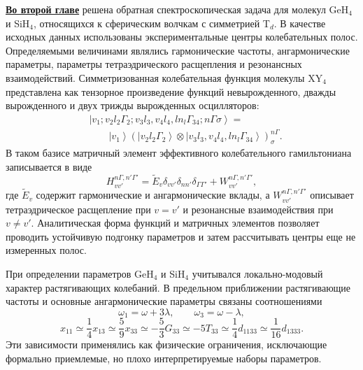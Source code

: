 \underline{\textbf{Во второй главе}} решена обратная спектроскопическая задача для молекул GeH$_4$
и SiH$_4$, относящихся к сферическим волчкам с симметрией T$_d$. В качестве исходных данных
использованы экспериментальные центры колебательных полос. Определяемыми величинами являлись
гармонические частоты, ангармонические параметры, параметры тетраэдрического расщепления и
резонансных взаимодействий. Симметризованная колебательная функция молекулы XY$_4$ представлена как
тензорное произведение функций невырожденного, дважды вырожденного и двух трижды вырожденных
осцилляторов:
\begin{equation}
\begin{aligned}
&\left|v_1;v_2l_2\Gamma_2;v_3l_3,v_4l_4,l n_l\Gamma_{34};n\Gamma\sigma\right\rangle =\\
&\qquad \left|v_1\right\rangle
\left(\left|v_2l_2\Gamma_2\right\rangle\otimes
\left|v_3l_3,v_4l_4,l n_l\Gamma_{34}\right\rangle\right)^{n\Gamma}_{\sigma}.
\end{aligned}
\label{eq:syn_basis}
\end{equation}
В таком базисе матричный элемент эффективного колебательного гамильтониана записывается в виде
\begin{equation}
H_{vv'}^{n\Gamma,n'\Gamma'}=
\widetilde{E}_{v}\delta_{vv'}\delta_{nn'}\delta_{\Gamma\Gamma'}+
W_{vv'}^{n\Gamma,n'\Gamma'},
\label{eq:syn_hamiltonian}
\end{equation}
где $\widetilde{E}_{v}$ содержит гармонические и ангармонические вклады, а
$W_{vv'}^{n\Gamma,n'\Gamma'}$ описывает тетраэдрическое расщепление при $v=v'$ и резонансные
взаимодействия при $v\ne v'$. Аналитическая форма функций и матричных элементов позволяет проводить
устойчивую подгонку параметров и затем рассчитывать центры еще не измеренных полос.

При определении параметров GeH$_4$ и SiH$_4$ учитывался локально-модовый характер растягивающих
колебаний. В предельном приближении растягивающие частоты и основные ангармонические параметры
связаны соотношениями
\begin{equation}
\omega_1=\omega+3\lambda,\qquad \omega_3=\omega-\lambda,
\end{equation}
\begin{equation}
 x_{11}\simeq\frac{1}{4}x_{13}\simeq\frac{5}{9}x_{33}\simeq
 -\frac{5}{3}G_{33}\simeq-5T_{33}\simeq\frac{1}{4}d_{1133}\simeq
 \frac{1}{16}d_{1333}.
\label{eq:syn_local}
\end{equation}
Эти зависимости применялись как физические ограничения, исключающие формально приемлемые, но плохо
интерпретируемые наборы параметров.

